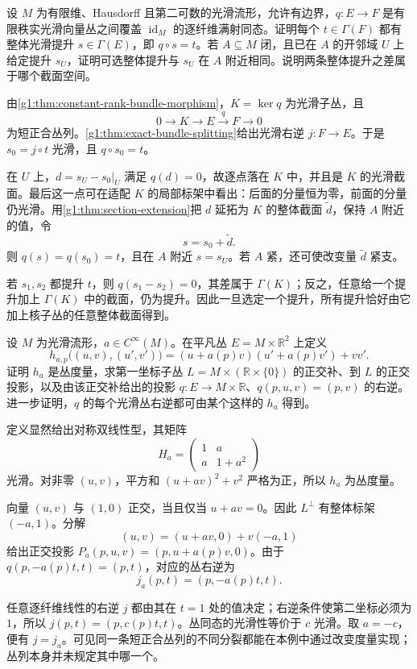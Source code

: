 \begin{exercise}\label{g1:ex:relative-lift-of-section}
	设 \(M\) 为有限维、Hausdorff 且第二可数的光滑流形，允许有边界，\(q:E\to F\) 是有限秩实光滑向量丛之间覆盖 \(\operatorname{id}_M\) 的逐纤维满射同态。证明每个 \(t\in\Gamma(F)\) 都有整体光滑提升 \(s\in\Gamma(E)\)，即 \(q\circ s=t\)。若 \(A\subseteq M\) 闭，且已在 \(A\) 的开邻域 \(U\) 上给定提升 \(s_U\)，证明可选整体提升与 \(s_U\) 在 \(A\) 附近相同。说明两条整体提升之差属于哪个截面空间。
\end{exercise}
\begin{solution}
	由\cref{g1:thm:constant-rank-bundle-morphism}，\(K=\ker q\) 为光滑子丛，且
	\[
		0\longrightarrow K\longrightarrow E\xrightarrow{\ q\ }F\longrightarrow0
	\]
	为短正合丛列。\cref{g1:thm:exact-bundle-splitting}给出光滑右逆 \(j:F\to E\)。于是 \(s_0=j\circ t\) 光滑，且 \(q\circ s_0=t\)。

	在 \(U\) 上，\(d=s_U-s_0|_U\) 满足 \(q(d)=0\)，故逐点落在 \(K\) 中，并且是 \(K\) 的光滑截面。最后这一点可在适配 \(K\) 的局部标架中看出：后面的分量恒为零，前面的分量仍光滑。用\cref{g1:thm:section-extension}把 \(d\) 延拓为 \(K\) 的整体截面 \(\widetilde d\)，保持 \(A\) 附近的值，令
	\[
		s=s_0+\widetilde d.
	\]
	则 \(q(s)=q(s_0)=t\)，且在 \(A\) 附近 \(s=s_U\)。若 \(A\) 紧，还可使改变量 \(\widetilde d\) 紧支。

	若 \(s_1,s_2\) 都提升 \(t\)，则 \(q(s_1-s_2)=0\)，其差属于 \(\Gamma(K)\)；反之，任意给一个提升加上 \(\Gamma(K)\) 中的截面，仍为提升。因此一旦选定一个提升，所有提升恰好由它加上核子丛的任意整体截面得到。
\end{solution}

\begin{exercise}\label{g1:ex:metric-dependent-splitting}
	设 \(M\) 为光滑流形，\(a\in C^\infty(M)\)。在平凡丛 \(E=M\times\mathbb R^2\) 上定义
	\[
		h_{a,p}\bigl((u,v),(u',v')\bigr)
		=(u+a(p)v)(u'+a(p)v')+vv'.
	\]
	证明 \(h_a\) 是丛度量，求第一坐标子丛 \(L=M\times(\mathbb R\times\{0\})\) 的正交补、到 \(L\) 的正交投影，以及由该正交补给出的投影 \(q:E\to M\times\mathbb R\)、\(q(p,u,v)=(p,v)\) 的右逆。进一步证明，\(q\) 的每个光滑丛右逆都可由某个这样的 \(h_a\) 得到。
\end{exercise}
\begin{solution}
	定义显然给出对称双线性型，其矩阵
	\[
		H_a=\begin{pmatrix}1&a\\a&1+a^2\end{pmatrix}
	\]
	光滑。对非零 \((u,v)\)，平方和 \((u+av)^2+v^2\) 严格为正，所以 \(h_a\) 为丛度量。

	向量 \((u,v)\) 与 \((1,0)\) 正交，当且仅当 \(u+av=0\)。因此 \(L^\perp\) 有整体标架 \((-a,1)\)。分解
	\[
		(u,v)=(u+av,0)+v(-a,1)
	\]
	给出正交投影 \(P_a(p,u,v)=(p,u+a(p)v,0)\)。由于 \(q(p,-a(p)t,t)=(p,t)\)，对应的丛右逆为
	\[
		j_a(p,t)=(p,-a(p)t,t).
	\]

	任意逐纤维线性的右逆 \(j\) 都由其在 \(t=1\) 处的值决定；右逆条件使第二坐标必须为 \(1\)，所以 \(j(p,t)=(p,c(p)t,t)\)。丛同态的光滑性等价于 \(c\) 光滑。取 \(a=-c\)，便有 \(j=j_a\)。可见同一条短正合丛列的不同分裂都能在本例中通过改变度量实现；丛列本身并未规定其中哪一个。
\end{solution}

